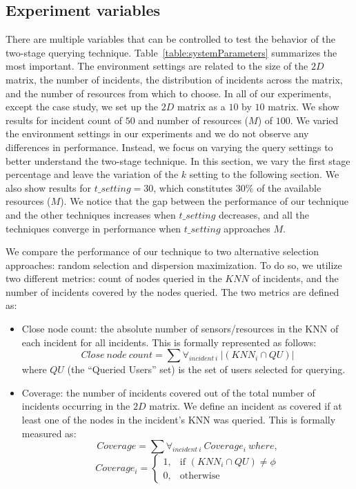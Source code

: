 \documentclass{acm_proc_article-sp}
\begin{document}
\subsection{Experiment variables}
There are multiple variables that can be controlled to test the behavior of the two-stage querying technique. Table~\ref{table:systemParameters} summarizes the most important.
The environment settings are related to the size of the $2D$ matrix, the number of incidents, the distribution of incidents across the matrix, and the number of resources from which to choose. In all of our experiments, except the case study, we set up the $2D$ matrix as a $10$ by $10$ matrix. We show results for incident count of $50$ and number of resources ($M$) of $100$. 
We varied the environment settings in our experiments and we do not observe any differences in performance. Instead, we focus on varying the query settings to better understand the two-stage technique. In this section, we vary the first stage percentage and leave the variation of the $k$ setting to the following section. We also show results for $t\_setting = 30$, which constitutes $30\%$ of the available resources ($M$). We notice that the gap between the performance of our technique and the other techniques increases when $t\_setting$ decreases, and all the techniques converge in performance when $t\_setting$ approaches $M$. \par

We compare the performance of our technique to two alternative selection approaches: random selection and dispersion maximization. To do so, we utilize two different metrics: count of nodes queried in the $KNN$ of incidents, and the number of incidents covered by the nodes queried. The two metrics are defined as:
\begin{itemize}
\item Close node count: the absolute number of sensors/resources in the KNN of each incident for all incidents. This is formally represented as follows:
\begin{equation}
Close\ node\ count = \sum \forall_{incident\ i}\ |(KNN_i \cap {QU})|
\end{equation}
where $QU$ (the ``Queried Users'' set) is the set of users selected for querying.
\item Coverage: the number of incidents covered out of the total number of incidents occurring in the $2D$ matrix. We define an incident as covered if at least one of the nodes in the incident's KNN was queried. This is formally measured as:
\begin{equation}
Coverage = \sum \forall_{incident\ i}\ Coverage_i\  where,
\end{equation}
\[
 Coverage_i =
\begin{cases}
 1,& \text{if }(KNN_i \cap {QU}) \neq \phi\\
 0,              & \text{otherwise}
\end{cases}
\]
\end{itemize}
\end{document}
